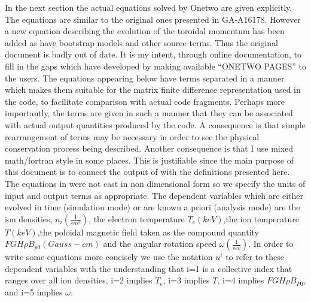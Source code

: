 In the next section the actual equations solved by Onetwo are
given explicitly. The equations are similar to the original
ones presented in GA-A16178. However a new equation describing
the evolution of the toroidal momentum has been added as have 
bootstrap models and other source terms. Thus the original document
is badly out of date. It is my intent, through online documentation,
to fill in the gaps which have developed by making available
``ONETWO PAGES'' to the users. The equations appearing below have
terms separated in a manner which makes them suitable for the matrix
finite difference representation used  in the code, to facilitate
comparison with actual code fragments. Perhaps  more importantly,
the terms are given  in such a manner that they can be associated
with actual output quantities produced by the code. A consequence
is that simple rearrangement of terms  may be necessary in
order to see the physical conservation process being described.
Another consequence is that I use mixed math/fortran style in
some places. This is justifiable since the main purpose of this
document is to connect the output of \ot with the definitions
presented here. 
The equations in \ot were not cast in non dimensional form
so we specify the units of input and output terms as
appropriate. 
The dependent variables which are either evolved in time
(simulation mode) or 
are known a priori (analysis mode) are the ion densities,
$n_i(\frac{1}{cm^3})$,
the electron temperature $T_e(keV)$,the ion temperature
$T(keV)$,the poloidal magnetic field taken as the compound
quantity $FGH\rho B_{p0}(Gauss-cm) $ and the angular rotation speed
$\omega (\frac{1}{sec})$. In order to write some equations more
concisely we use the notation $u^i$ to refer to these dependent
variables with the understanding that i=1 is a collective index that 
ranges over all ion densities, i=2 implies $T_e$, i=3 implies $T$,
i=4 implies $FGH\rho B_{P0}$, and i=5 implies $\omega$.
